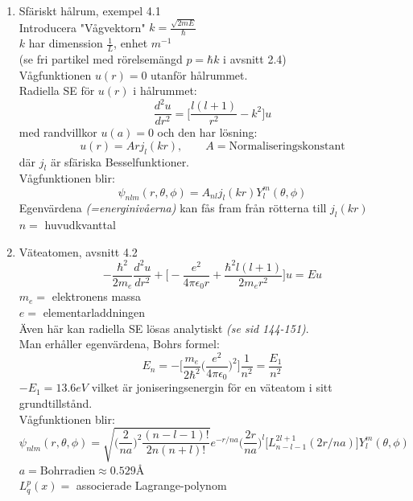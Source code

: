 \documentclass{article}
\begin{document}
      \begin{enumerate}
        \item Sfäriskt hålrum, exempel 4.1\\
        Introducera "Vågvektorn" $k=\frac{\sqrt{2mE}}{\hbar}$\\
        $k$ har dimenssion $\frac{1}{L}$, enhet $m^{-1}$\\
        (se fri partikel med rörelsemängd $p=\hbar k$ i avsnitt 2.4)\\
        Vågfunktionen $u(r)=0$ utanför hålrummet.\\
        Radiella SE för $u(r)$ i hålrummet:
        \[
          \frac{d^2 u}{dr^2}=\bigg[\frac{l(l+1)}{r^2}-k^2\bigg]u
        \]
        med randvillkor $u(a)=0$ och den har lösning:
        \[
          u(r)=Arj_l(kr),\qquad A=\text{Normaliseringskonstant}
        \]
        där $j_l$ är sfäriska Besselfunktioner.\\

        Vågfunktionen blir:
        \[
          \psi_{nlm}(r,\theta,\phi)=A_{nl}j_l(kr)Y_l^m(\theta,\phi)
        \]
        Egenvärdena \textit{(=energinivåerna)} kan fås fram från rötterna till $j_l(kr)$\\

        $n=$ huvudkvanttal

        \item Väteatomen, avsnitt 4.2\\
        \[
          -\frac{\hbar^2}{2m_e}\frac{d^2u}{dr^2}+\bigg[-\frac{e^2}{4\pi\epsilon_0r}+\frac{\hbar^2l(l+1)}{2m_er^2}\bigg]u=Eu
        \]
        $m_e=$ elektronens massa\\
        $e=$ elementarladdningen\\

        Även här kan radiella SE lösas analytiskt \textit{(se sid 144-151)}.\\
        Man erhåller egenvärdena, Bohrs formel:
        \[
          E_n=-\bigg[\frac{m_e}{2\hbar^2}\bigg(\frac{e^2}{4\pi\epsilon_0}\bigg)^2\bigg]\frac{1}{n^2}=\frac{E_1}{n^2}
        \]
        $-E_1=13.6eV$ vilket är joniseringsenergin för en väteatom i sitt grundtillstånd.\\

        Vågfunktionen blir:
        \[
          \psi_{nlm}(r,\theta,\phi)=\sqrt{\big(\frac{2}{na}\big)^2\frac{(n-l-1)!}{2n(n+l)!}}e^{-r/na}\big(\frac{2r}{na}\big)^l\bigg[L_{n-l-1}^{2l+1}(2r/na)\bigg]Y_l^m(\theta,\phi)
        \]
        $a=\text{Bohrradien}\approx0.529$Å\\
        $L_q^p(x)=$ associerade Lagrange-polynom\\


\end{enumerate}
\end{document}
